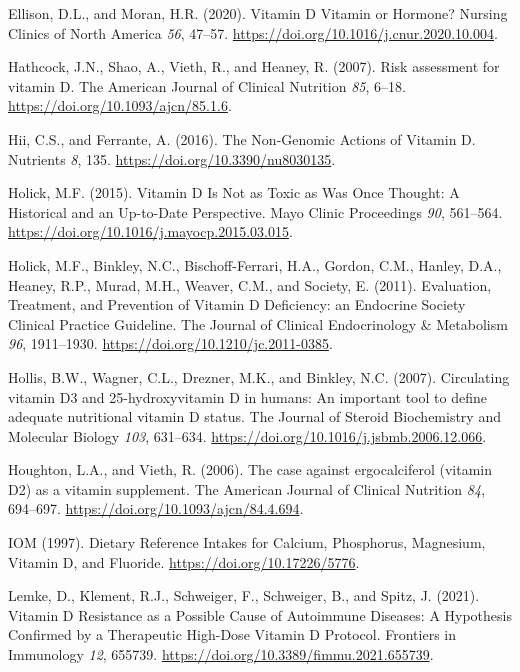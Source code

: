 \documentclass[
  a4paper,
  DIV=11,
  numbers=noendperiod,
  listof=totoc]{scrreprt}
\newlength{\cslhangindent}
\newlength{\cslentryspacingunit} %
\newenvironment{CSLReferences}[2] %
 {%
  \setlength{\parindent}{0pt}
  \ifodd #1
  \let\oldpar\par
  \def\par{\hangindent=\cslhangindent\oldpar}
  \fi
  \setlength{\parskip}{#2\cslentryspacingunit}
 }%
 {}
\begin{document}
\begin{CSLReferences}{0}{0}
\leavevmode{}%
Ellison, D.L., and Moran, H.R. (2020). {Vitamin D Vitamin or Hormone?}
Nursing Clinics of North America \emph{56}, 47--57.
\url{https://doi.org/10.1016/j.cnur.2020.10.004}.

\leavevmode{}%
Hathcock, J.N., Shao, A., Vieth, R., and Heaney, R. (2007). {Risk
assessment for vitamin D}. The American Journal of Clinical Nutrition
\emph{85}, 6--18. \url{https://doi.org/10.1093/ajcn/85.1.6}.

\leavevmode{}%
Hii, C.S., and Ferrante, A. (2016). {The Non-Genomic Actions of Vitamin
D}. Nutrients \emph{8}, 135. \url{https://doi.org/10.3390/nu8030135}.

\leavevmode{}%
Holick, M.F. (2015). {Vitamin D Is Not as Toxic as Was Once Thought: A
Historical and an Up-to-Date Perspective}. Mayo Clinic Proceedings
\emph{90}, 561--564. \url{https://doi.org/10.1016/j.mayocp.2015.03.015}.

\leavevmode{}%
Holick, M.F., Binkley, N.C., Bischoff-Ferrari, H.A., Gordon, C.M.,
Hanley, D.A., Heaney, R.P., Murad, M.H., Weaver, C.M., and Society, E.
(2011). {Evaluation, Treatment, and Prevention of Vitamin D Deficiency:
an Endocrine Society Clinical Practice Guideline}. The Journal of
Clinical Endocrinology \& Metabolism \emph{96}, 1911--1930.
\url{https://doi.org/10.1210/jc.2011-0385}.

\leavevmode{}%
Hollis, B.W., Wagner, C.L., Drezner, M.K., and Binkley, N.C. (2007).
{Circulating vitamin D3 and 25-hydroxyvitamin D in humans: An important
tool to define adequate nutritional vitamin D status}. The Journal of
Steroid Biochemistry and Molecular Biology \emph{103}, 631--634.
\url{https://doi.org/10.1016/j.jsbmb.2006.12.066}.

\leavevmode{}%
Houghton, L.A., and Vieth, R. (2006). {The case against ergocalciferol
(vitamin D2) as a vitamin supplement}. The American Journal of Clinical
Nutrition \emph{84}, 694--697.
\url{https://doi.org/10.1093/ajcn/84.4.694}.

\leavevmode{}%
IOM (1997). {Dietary Reference Intakes for Calcium, Phosphorus,
Magnesium, Vitamin D, and Fluoride}.
\url{https://doi.org/10.17226/5776}.

\leavevmode{}%
Lemke, D., Klement, R.J., Schweiger, F., Schweiger, B., and Spitz, J.
(2021). {Vitamin D Resistance as a Possible Cause of Autoimmune
Diseases: A Hypothesis Confirmed by a Therapeutic High-Dose Vitamin D
Protocol}. Frontiers in Immunology \emph{12}, 655739.
\url{https://doi.org/10.3389/fimmu.2021.655739}.


\end{CSLReferences}
\end{document}

